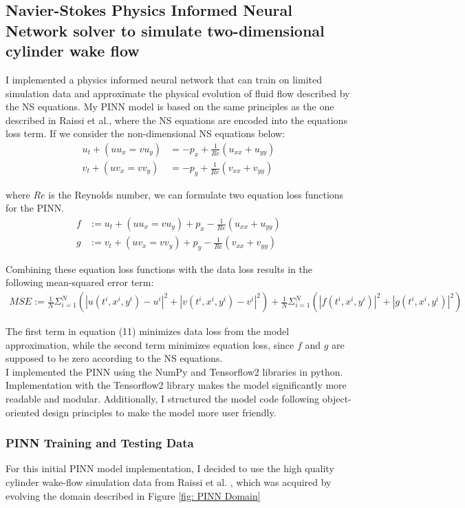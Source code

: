 \subsection{Navier-Stokes Physics Informed Neural Network solver to simulate two-dimensional cylinder wake flow}

I implemented a physics informed neural network that can train on limited simulation data and approximate the physical evolution of fluid flow described by the NS equations. My PINN model is based on the same principles as the one described in Raissi et al.\cite{Raissi2019}, where the NS equations are encoded into the equations loss term. If we consider the non-dimensional NS equations below:
\begin{align}
    u_{t} + (uu_{x} = vu_{y}) &= -p_{x} + \frac{1}{Re} (u_{xx} + u_{yy}) \\
    v_{t} + (uv_{x} = vv_{y}) &= -p_{y} + \frac{1}{Re} (v_{xx} + v_{yy})
\end{align} 

\noindent where $Re$ is the Reynolds number, we can formulate two equation loss functions for the PINN.
\begin{align}
    f &:= u_{t} + (uu_{x} = vu_{y}) + p_{x} - \frac{1}{Re} (u_{xx} + u_{yy}) \\
    g &:= v_{t} + (uv_{x} = vv_{y}) +p_{y} - \frac{1}{Re} (v_{xx} + v_{yy})
\end{align} 

\noindent Combining these equation loss functions with the data loss results in the following mean-squared error term:
\begin{align}
    MSE := \frac{1}{N} \Sigma^{N}_{i = 1} (|u(t^{i}, x^{i}, y^{i}) - u^{i}|^2 +  |v(t^{i}, x^{i}, y^{i}) - v^{i}|^2) + \frac{1}{N} \Sigma^{N}_{i = 1} (|f(t^{i}, x^{i}, y^{i})|^2 + |g(t^{i}, x^{i}, y^{i})|^2)
\end{align}

\noindent The first term in equation (11) minimizes data loss from the model approximation, while the second term minimizes equation loss, since $f$ and $g$ are supposed to be zero according to the NS equations.\\

I implemented the PINN using the NumPy and Tensorflow2 libraries in python. Implementation with the Tensorflow2 library makes the model significantly more readable and modular. Additionally,  I structured the model code following object-oriented design principles to make the model more user friendly.

\subsubsection{PINN Training and Testing Data}
For this initial PINN model implementation, I decided to use the high quality cylinder wake-flow simulation data from Raissi et al. \cite{Raissi2019}, which was acquired by evolving the domain described in Figure \ref{fig: PINN Domain}



